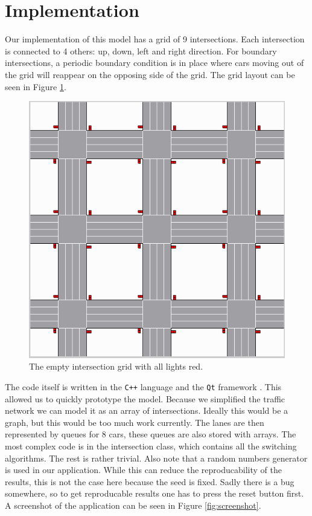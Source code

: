 \documentclass[a4paper,11pt]{article}
\begin{document}
\section{Implementation}\label{sec:implementation}

Our implementation of this model has a grid of 9 intersections.
Each intersection is connected to 4 others: up, down, left and right direction.
For boundary intersections, a periodic boundary condition is in place where
cars moving out of the grid will reappear on the opposing side of the grid.
The grid layout can be seen in Figure \ref{fig:intersections}.

\begin{figure}[H]
  \centering
  \includegraphics[width=.8\linewidth]{img/intersections.png}
  \caption{The empty intersection grid with all lights red.}
  \label{fig:intersections}
\end{figure}

The code itself is written in the \verb|C++| language \cite{cpp} and the \verb|Qt| framework \cite{qt}.
This allowed us to quickly prototype the model.
Because we simplified the traffic network we can model it as an array of intersections.
Ideally this would be a graph, but this would be too much work currently.
The lanes are then represented by queues for 8 cars, these queues are also stored with arrays.
The most complex code is in the intersection class, which contains all the switching algorithms.
The rest is rather trivial.
Also note that a random numbers generator is used in our application.
While this can reduce the reproducability of the results, this is not the case here because the seed is fixed.
Sadly there is a bug somewhere, so to get reproducable results one has to press the reset button first.
A screenshot of the application can be seen in Figure \ref{fig:screenshot}.
\end{document}
